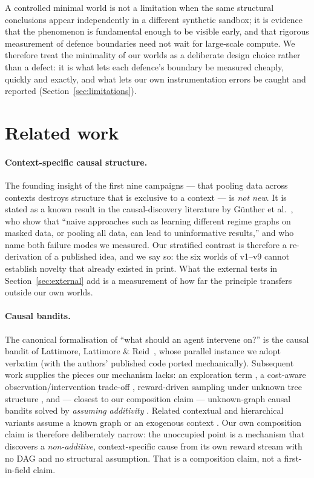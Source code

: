 \documentclass[11pt]{article}
\begin{document}
A controlled minimal world is not a limitation when the same structural conclusions
appear independently in a different synthetic sandbox; it is evidence that the
phenomenon is fundamental enough to be visible early, and that rigorous measurement of
defence boundaries need not wait for large-scale compute. We therefore treat the
minimality of our worlds as a deliberate design choice rather than a defect: it is what
lets each defence's boundary be measured cheaply, quickly and exactly, and what lets
our own instrumentation errors be caught and reported (Section~\ref{sec:limitations}).

\section{Related work}
\label{sec:related}

\paragraph{Context-specific causal structure.}
The founding insight of the first nine campaigns --- that pooling data across contexts
destroys structure that is exclusive to a context --- is \emph{not new}. It is stated
as a known result in the causal-discovery literature by
G\"unther et al.~\cite{gunther2024context}, who show that ``naive approaches such as
learning different regime graphs on masked data, or pooling all data, can lead to
uninformative results,'' and who name both failure modes we measured. Our stratified
contrast is therefore a re-derivation of a published idea, and we say so: the six
worlds of v1--v9 cannot establish novelty that already existed in print. What the
external tests in Section~\ref{sec:external} add is a measurement of how far the
principle transfers outside our own worlds.

\paragraph{Causal bandits.}
The canonical formalisation of ``what should an agent intervene on?'' is the causal
bandit of Lattimore, Lattimore \& Reid~\cite{lattimore2016causal}, whose parallel
instance we adopt verbatim (with the authors' published code ported mechanically).
Subsequent work supplies the pieces our mechanism lacks: an exploration term
\cite{lattimore2016causal}, a cost-aware observation/intervention trade-off
\cite{nair2020budgeted}, reward-driven sampling under unknown tree structure
\cite{lu2021unknown}, and --- closest to our composition claim --- unknown-graph
causal bandits solved by \emph{assuming additivity} \cite{malek2023additive}. Related
contextual and hierarchical variants assume a known graph or an exogenous context
\cite{song2021hierarchical,elahi2024partial}. Our own composition claim is therefore
deliberately narrow: the unoccupied point is a mechanism that discovers a
\emph{non-additive}, context-specific cause from its own reward stream with no DAG
and no structural assumption. That is a composition claim, not a first-in-field claim.
\end{document}

